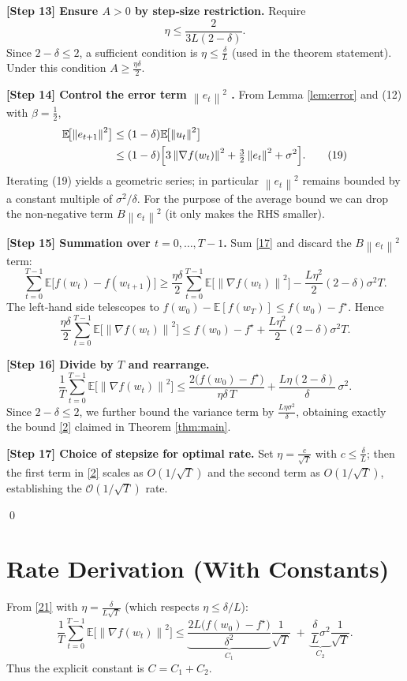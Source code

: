 \documentclass{article}
\newcommand{\E}{\mathbb{E}}
\newcommand{\norm}[1]{\left\|#1\right\|}
\begin{document}
\noindent\textbf{[Step 13] Ensure $A>0$ by step‑size restriction.}  
Require
\[
\eta \le \frac{2}{3L(2-\delta)} .
\tag{18}
\]
Since $2-\delta\le 2$, a sufficient condition is $\eta\le\frac{\delta}{L}$ (used in the theorem statement). Under this condition $A\ge \frac{\eta\delta}{2}$.

\noindent\textbf{[Step 14] Control the error term $ \norm{e_t}^2$ .}  
From Lemma \ref{lem:error} and (12) with $\beta=\frac12$,
\begin{align}
\E\!\bigl[\norm{e_{t+1}}^2\bigr]
&\le (1-\delta)\E\!\bigl[\norm{u_t}^2\bigr] \nonumber\\
&\le (1-\delta)\Bigl[3\norm{\nabla f(w_t)}^2
      +\tfrac{3}{2}\norm{e_t}^2 + \sigma^2\Bigr] .
\tag{19}
\end{align}
Iterating (19) yields a geometric series; in particular $ \norm{e_t}^2$ remains bounded by a constant multiple of $\sigma^2/\delta$. For the purpose of the average bound we can drop the non‑negative term $B\norm{e_t}^2$ (it only makes the RHS smaller).

\noindent\textbf{[Step 15] Summation over $t=0,\dots,T-1$.}  
Sum \eqref{17} and discard the $B\norm{e_t}^2$ term:
\[
\sum_{t=0}^{T-1}\E\!\bigl[f(w_t)-f(w_{t+1})\bigr]
\ge \frac{\eta\delta}{2}\sum_{t=0}^{T-1}\E\!\bigl[\norm{\nabla f(w_t)}^2\big]
   -\frac{L\eta^2}{2}(2-\delta)\sigma^2 T .
\]
The left‑hand side telescopes to $f(w_0)-\E[f(w_T)]\le f(w_0)-f^\star$. Hence
\[
\frac{\eta\delta}{2}\sum_{t=0}^{T-1}\E\!\bigl[\norm{\nabla f(w_t)}^2\big]
\le f(w_0)-f^\star +\frac{L\eta^2}{2}(2-\delta)\sigma^2 T .
\tag{20}
\]

\noindent\textbf{[Step 16] Divide by $T$ and rearrange.}  
\[
\frac{1}{T}\sum_{t=0}^{T-1}\E\!\bigl[\norm{\nabla f(w_t)}^2\big]
\le
\frac{2\bigl(f(w_0)-f^\star\bigr)}{\eta\delta\,T}
   +\frac{L\eta(2-\delta)}{\delta}\,\sigma^2 .
\tag{21}
\]
Since $2-\delta\le 2$, we further bound the variance term by $\frac{L\eta\sigma^2}{\delta}$, obtaining exactly the bound \eqref{2} claimed in Theorem \ref{thm:main}.

\noindent\textbf{[Step 17] Choice of stepsize for optimal rate.}  
Set $\eta = \frac{c}{\sqrt{T}}$ with $c\le \frac{\delta}{L}$; then the first term in \eqref{2} scales as $O(1/\sqrt{T})$ and the second term as $O(1/\sqrt{T})$, establishing the $\mathcal{O}(1/\sqrt{T})$ rate.

\qed

\section*{Rate Derivation (With Constants)}
From \eqref{21} with $\eta = \frac{\delta}{L\sqrt{T}}$ (which respects $\eta\le\delta/L$):
\[
\frac{1}{T}\sum_{t=0}^{T-1}\E\!\bigl[\norm{\nabla f(w_t)}^2\bigr]
\le
\underbrace{\frac{2L\bigl(f(w_0)-f^\star\bigr)}{\delta^2}}_{\displaystyle C_1}\frac{1}{\sqrt{T}}
\;+\;
\underbrace{\frac{\delta}{L}\sigma^2}_{\displaystyle C_2}\frac{1}{\sqrt{T}} .
\]
Thus the explicit constant is $C = C_1+C_2$.
\end{document}
